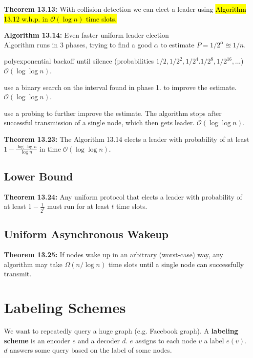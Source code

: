 \documentclass[a4paper, 8pt, landscape]{scrartcl}
\begin{document}
\begin{multicols*}{3}
\textbf{Theorem 13.13:} With collision detection we can elect a leader using \hl{Algorithm 13.12 w.h.p. in $\mathcal{O}(\log n)$ time slots.}


\textbf{Algorithm 13.14:} Even faster uniform leader election\\
Algorithm runs in 3 phases, trying to find a good $\alpha$ to estimate $P= 1/2^\alpha \approxeq 1/n$. 
\begin{compactenum}
\item polyexponential backoff until silence (probabilities $1/2, 1/2^2, 1/2^4. 1/2^8, 1/2^16, ...$) $\mathcal{O}(\log \log n)$.
\item use a binary search on the interval found in phase 1. to improve the estimate. $\mathcal{O}(\log \log n)$.
\item use a probing to further improve the estimate. The algorithm stops after successful transmission of a single node, which then gets leader. $\mathcal{O}(\log \log n)$.
\end{compactenum}

\textbf{Theorem 13.23:} The Algorithm 13.14 elects a leader with probability of at least $1 - \frac{\log \log n}{\log n}$ in time $\mathcal{O}(\log \log n)$.


\subsection{Lower Bound}

\textbf{Theorem 13.24:} Any uniform protocol that elects a leader with probability of at least $1 - \frac{1}{2^t}$ must run for at least $t$ time slots.


\subsection{Uniform Asynchronous Wakeup}

\textbf{Theorem 13.25:} If nodes wake up in an arbitrary (worst-case) way, any algorithm may take $\Omega(n/ \log n)$ time slots until a single node can successfully transmit.

\vspace*{50mm}

\columnbreak

\section{Labeling Schemes}

We want to repeatedly query a huge graph (e.g. Facebook graph). A \textbf{labeling scheme} is an encoder $e$ and a decoder $d$. $e$ assigns to each node $v$ a label $e(v)$. $d$ answers some query based on the label of some nodes.


\end{multicols*}
\end{document}
